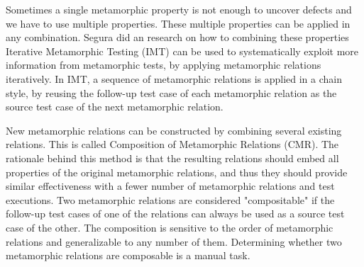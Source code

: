 Sometimes a single metamorphic property is not enough to uncover defects and we have to use multiple properties. These multiple properties can be applied in any combination. Segura did an research on how to combining these properties
\cite{Segura2016} Iterative Metamorphic Testing (IMT) can be used to systematically exploit more information from metamorphic tests, by applying metamorphic relations iteratively. In IMT, a sequence of metamorphic relations is applied in a chain style, by reusing the follow-up test case of each metamorphic relation as the source test case of the next metamorphic relation. \par
New metamorphic relations can be constructed by combining several existing relations. This is called Composition of Metamorphic Relations (CMR)\cite{Segura2016}. The rationale behind this method is that the resulting relations should embed all properties of the original metamorphic relations, and thus they should provide similar effectiveness with a fewer number of metamorphic relations and test executions. Two metamorphic relations are considered "compositable" if the follow-up test cases of one of the relations can always be used as a source test case of the other. The composition is sensitive to the order of metamorphic relations and generalizable to any number of them. Determining whether two metamorphic relations are composable is a manual task. 

